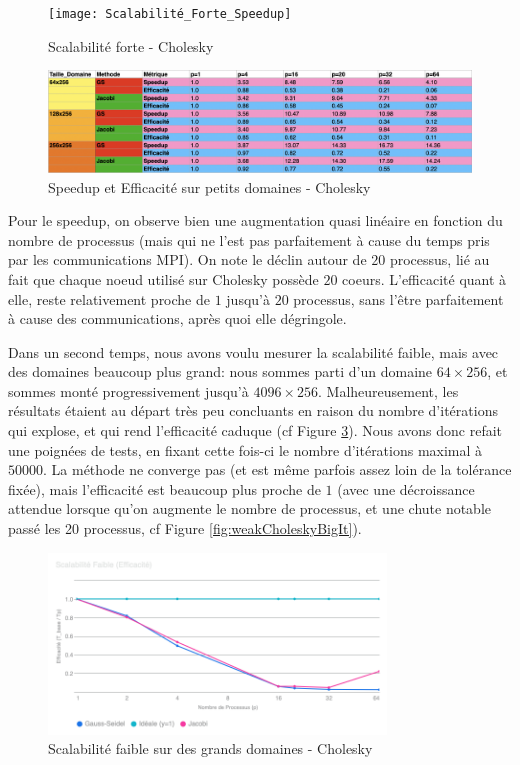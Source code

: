 \documentclass{article}
\begin{document}
\begin{figure}[H]
    \centering
    \texttt{[image: Scalabilité\_Forte\_Speedup]}
    \caption{Scalabilité forte - Cholesky}
    \label{fig:strongCholeskySmol}
\end{figure}

\begin{figure}[H]
    \centering
    \includegraphics[width=\textwidth]{choleskySmol.png}
    \caption{Speedup et Efficacité sur petits domaines - Cholesky}
    \label{fig:weakCholeskySmol}
\end{figure}

Pour le speedup, on observe bien une augmentation quasi linéaire en fonction du nombre de processus (mais qui ne l'est pas parfaitement à cause du temps pris par les communications MPI). On note le déclin autour de $20$ processus, lié au fait que chaque noeud utilisé sur Cholesky possède $20$ coeurs. L'efficacité quant à elle, reste relativement proche de $1$ jusqu'à $20$ processus, sans l'être parfaitement à cause des communications, après quoi elle dégringole.

Dans un second temps, nous avons voulu mesurer la scalabilité faible, mais avec des domaines beaucoup plus grand: nous sommes parti d'un domaine $64\times 256$, et sommes monté progressivement jusqu'à $4096\times 256$. Malheureusement, les résultats étaient au départ très peu concluants en raison du nombre d'itérations qui explose, et qui rend l'efficacité caduque (cf Figure \ref{fig:weakCholeskyBigDom}). Nous avons donc refait une poignées de tests, en fixant cette fois-ci le nombre d'itérations maximal à $50000$. La méthode ne converge pas (et est même parfois assez loin de la tolérance fixée), mais l'efficacité est beaucoup plus proche de $1$ (avec une décroissance attendue lorsque qu'on augmente le nombre de processus, et une chute notable passé les 20 processus, cf Figure \ref{fig:weakCholeskyBigIt}).

\begin{figure}[H]
    \centering
    \includegraphics[width=0.8\textwidth]{Scalabilité_Faible_Efficacité}
    \caption{Scalabilité faible sur des grands domaines - Cholesky}
    \label{fig:weakCholeskyBigDom}
\end{figure}
\end{document}
